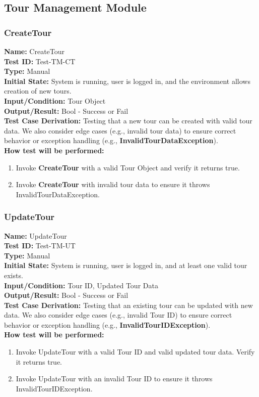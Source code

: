\documentclass[12pt, titlepage]{article}
\begin{document}
\subsection{Tour Management Module}
\subsubsection{CreateTour}
\textbf{Name:} CreateTour \label{itm:Test-TM-CT} \\
\textbf{Test ID:} Test-TM-CT \\
\textbf{Type:} Manual \\
\textbf{Initial State:} System is running, user is logged in, and the environment allows creation of new tours. \\
\textbf{Input/Condition:} Tour Object \\
\textbf{Output/Result:} Bool - Success or Fail \\
\textbf{Test Case Derivation:} Testing that a new tour can be created with valid tour data. We also consider edge cases (e.g., invalid tour data) to ensure correct behavior or exception handling (e.g., \textbf{InvalidTourDataException}).\\
\textbf{How test will be performed:}
\begin{enumerate}
    \item Invoke \textbf{CreateTour} with a valid Tour Object and verify it returns true.
    \item Invoke \textbf{CreateTour} with invalid tour data to ensure it throws InvalidTourDataException.
\end{enumerate}

\subsubsection{UpdateTour}
\textbf{Name:} UpdateTour \label{itm:Test-TM-UT} \\
\textbf{Test ID:} Test-TM-UT \\
\textbf{Type:} Manual \\
\textbf{Initial State:} System is running, user is logged in, and at least one valid tour exists. \\
\textbf{Input/Condition:} Tour ID, Updated Tour Data \\
\textbf{Output/Result:} Bool - Success or Fail \\
\textbf{Test Case Derivation:} Testing that an existing tour can be updated with new data. We also consider edge cases (e.g., invalid Tour ID) to ensure correct behavior or exception handling (e.g., \textbf{InvalidTourIDException}).\\
\textbf{How test will be performed:}
\begin{enumerate}
    \item Invoke UpdateTour with a valid Tour ID and valid updated tour data. Verify it returns true.
    \item Invoke UpdateTour with an invalid Tour ID to ensure it throws InvalidTourIDException.
\end{enumerate}
\end{document}
